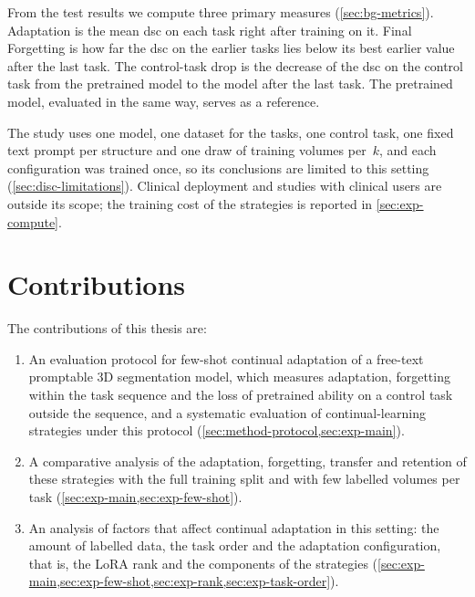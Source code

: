 From the test results we compute three primary measures (\cref{sec:bg-metrics}).
Adaptation is the mean \gls{dsc} on each task right after training on it.
Final Forgetting is how far the \gls{dsc} on the earlier tasks lies below its best earlier value after the last task.
The control-task drop is the decrease of the \gls{dsc} on the control task from the pretrained model to the model after the last task.
The pretrained model, evaluated in the same way, serves as a reference.

The study uses one model, one dataset for the tasks, one control task, one fixed text prompt per structure and one draw of training volumes per~$k$, and each configuration was trained once, so its conclusions are limited to this setting (\cref{sec:disc-limitations}).
Clinical deployment and studies with clinical users are outside its scope; the training cost of the strategies is reported in \cref{sec:exp-compute}.

\section{Contributions}
\label{sec:intro-contributions}

The contributions of this thesis are:
\begin{enumerate}
  \item An evaluation protocol for few-shot continual adaptation of a free-text promptable 3D segmentation model, which measures adaptation, forgetting within the task sequence and the loss of pretrained ability on a control task outside the sequence, and a systematic evaluation of continual-learning strategies under this protocol (\cref{sec:method-protocol,sec:exp-main}).
  \item A comparative analysis of the adaptation, forgetting, transfer and retention of these strategies with the full training split and with few labelled volumes per task (\cref{sec:exp-main,sec:exp-few-shot}).
  \item An analysis of factors that affect continual adaptation in this setting: the amount of labelled data, the task order and the adaptation configuration, that is, the LoRA rank and the components of the strategies (\cref{sec:exp-main,sec:exp-few-shot,sec:exp-rank,sec:exp-task-order}).
\end{enumerate}

